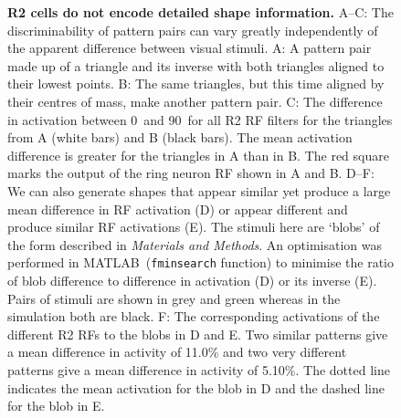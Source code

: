 \documentclass[10pt]{article}
\newcommand{\Matlab}{MATLAB}
\begin{document}
\begin{figure}[htp]
	\caption{
		{\bf R2 cells do not encode detailed shape information.}
		A--C: The discriminability of pattern pairs can vary greatly independently of the apparent difference between visual stimuli.
		A: A pattern pair made up of a triangle and its inverse with both triangles aligned to their lowest points.
		B: The same triangles, but this time aligned by their centres of mass, make another pattern pair.
		C: The difference in activation between 0\degree\ and 90\degree\ for all R2 RF filters for the triangles from A (white bars) and B (black bars). The mean activation difference is greater for the triangles in A than in B. The red square marks the output of the ring neuron \ac{RF} shown in A and B. 
		D--F: We can also generate shapes that appear similar yet produce a large mean difference in RF activation (D) or appear different and produce similar RF activations (E). The stimuli here are `blobs' of the form described in \emph{Materials and Methods}. An optimisation was performed in \Matlab\ (\texttt{fminsearch} function) to minimise the ratio of blob difference to difference in activation (D) or its inverse (E). Pairs of stimuli are shown in grey and green whereas in the simulation both are black.
		F: The corresponding activations of the different R2 RFs to the blobs in D and E. Two similar patterns give a mean difference in activity of 11.0\% and two very different patterns give a mean difference in activity of 5.10\%. The dotted line indicates the mean activation for the blob in D and the dashed line for the blob in E.
	}
	\label{fig:simdiffpatts}
\end{figure}
\end{document}

